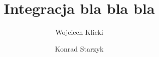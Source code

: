 \documentclass{article}
\begin{document}
\title{Integracja bla bla bla}
\author{Wojciech Klicki 	\and Konrad Starzyk}
\date{}  
\maketitle
\tableofcontents
\clearpage


 
\end{document}
